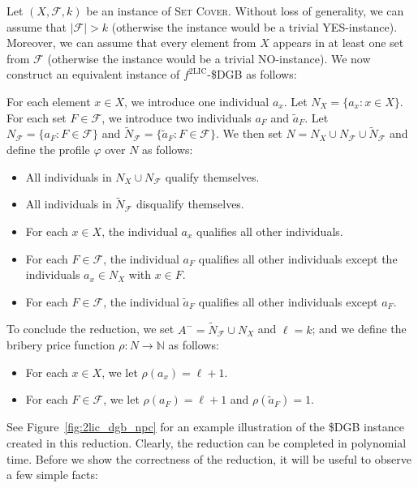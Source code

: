 \documentclass[
    12pt,               %
    a4paper,            %
    bibtotoc,           %
    pointlessnumbers,   %
    ngerman,            %
    titlepage,          %
    leqno,              %
    ]{scrarticle}       %
\newcommand\figref{Figure~\ref}
\begin{document}
\begin{Proof}
Let $(X, \mathcal{F}, k)$ be an instance of \textsc{Set Cover}. Without loss of generality, we can assume that $|\mathcal{F}| > k$ (otherwise the instance would be a trivial YES-instance). Moreover, we can assume that every element from $X$ appears in at least one set from $\mathcal{F}$ (otherwise the instance would be a trivial NO-instance). We now construct an equivalent instance of $f^{\text{2LIC}}$-\$DGB as follows:

For each element $x \in X$, we introduce one individual $a_x$. Let $N_X = \{ a_x : x \in X \}$. For each set $F \in \mathcal{F}$, we introduce two individuals $a_F$ and $\tilde{a}_F$. Let $N_\mathcal{F} = \{ a_F : F \in \mathcal{F} \}$ and $\tilde{N}_\mathcal{F} = \{ \tilde{a}_F : F \in \mathcal{F} \}$. We then set $N = N_X \cup N_\mathcal{F} \cup \tilde{N}_\mathcal{F}$ and define the profile $\varphi$ over $N$ as follows:

\begin{itemize}[nolistsep]
\item
All individuals in $N_X \cup N_\mathcal{F}$ qualify themselves.
\item
All individuals in $\tilde{N}_\mathcal{F}$ disqualify themselves.
\item
For each $x \in X$, the individual $a_x$ qualifies all other individuals.
\item
For each $F \in \mathcal{F}$, the individual $a_F$ qualifies all other individuals except the individuals $a_x \in N_X$ with $x \in F$.
\item
For each $F \in \mathcal{F}$, the individual $\tilde{a}_F$ qualifies all other individuals except $a_F$.
\end{itemize}

To conclude the reduction, we set $A^- = \tilde{N}_\mathcal{F} \cup N_X$ and $\ell = k$; and we define the bribery price function $\rho : N \rightarrow \mathbb{N}$ as follows:

\begin{itemize}[nolistsep]
\item
For each $x \in X$, we let $\rho(a_x) = \ell + 1$.
\item
For each $F \in \mathcal{F}$, we let $\rho(a_F) = \ell + 1$ and $\rho(\tilde{a}_F) = 1$.
\end{itemize}

See \figref{fig:2lic_dgb_npc} for an example illustration of the \$DGB instance created in this reduction. Clearly, the reduction can be completed in polynomial time. Before we show the correctness of the reduction, it will be useful to observe a few simple facts:




\end{Proof}
\end{document}
